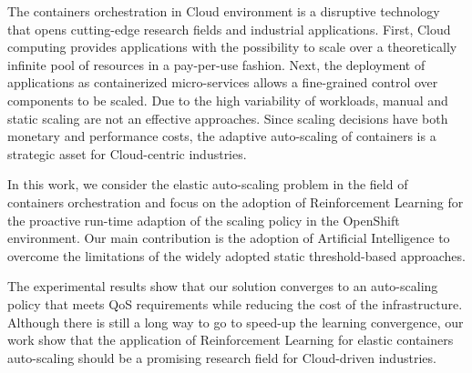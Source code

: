 The containers orchestration in Cloud environment is a disruptive technology that opens cutting-edge research fields and industrial applications.
%
First, Cloud computing provides applications with the possibility to scale over a theoretically infinite pool of resources in a pay-per-use fashion.
%
Next, the deployment of applications as containerized micro-services allows a fine-grained control over components to be scaled.
%
%
Due to the high variability of workloads, manual and static scaling are not an effective approaches.
%
Since scaling decisions have both monetary and performance costs, the adaptive auto-scaling of containers is a strategic asset for Cloud-centric industries.


In this work, we consider the elastic auto-scaling problem in the field of containers orchestration and focus on the adoption of Reinforcement Learning for the proactive run-time adaption of the scaling policy in the OpenShift environment.
%
Our main contribution is the adoption of Artificial Intelligence to overcome the limitations of the widely adopted static threshold-based approaches.

%
%
The experimental results show that our solution converges to an auto-scaling policy that meets QoS requirements while reducing the cost of the infrastructure. 
%
%
Although there is still a long way to go to speed-up the learning convergence, our work show that the application of Reinforcement Learning for elastic containers auto-scaling should be a promising research field for Cloud-driven industries.
